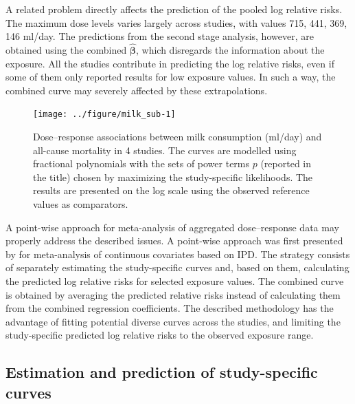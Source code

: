 \documentclass[11pt,a4paper,twoside,openany]{book}\usepackage{knitr}
\begin{document}
{{\noindent A related problem directly affects the prediction of the pooled log relative risks. The maximum dose levels varies largely across studies, with values 715, 441, 369, 146 ml/day. 
The predictions from the second stage analysis, however, are obtained using the combined $\boldsymbol{\hat \beta}$, which disregards the information about the exposure. All the studies contribute in predicting the log relative risks, even if some of them only reported results for low exposure values. In such a way, the combined curve may severely affected by these extrapolations.

\begin{knitrout}\footnotesize
{}\color{fgcolor}\begin{figure}[ht!]

{\centering \texttt{[image: ../figure/milk\_sub-1]} 

}

\caption[Dose--response associations between milk consumption (ml/day) and all-cause mortality in 4 studies]{Dose--response associations between milk consumption (ml/day) and all-cause mortality in 4 studies. The curves are modelled using fractional polynomials with the sets of power terms $p$ (reported in the title) chosen by maximizing the study-specific likelihoods. The results are presented on the log scale using the observed reference values as comparators.}\label{fig:milk_sub}
\end{figure}


\end{knitrout}

A point-wise approach for meta-analysis of aggregated dose--response data may properly address the described issues.
A point-wise approach was first presented by \cite{sauerbrei2011new} for meta-analysis of continuous covariates based on IPD. The strategy consists of separately estimating the study-specific curves and, based on them, calculating the predicted log relative risks for selected exposure values. The combined curve is obtained by averaging the predicted relative risks instead of calculating them from the combined regression coefficients. The described methodology has the advantage of fitting potential diverse curves across the studies, and limiting the study-specific predicted log relative risks to the observed exposure range.   

\subsection{Estimation and prediction of study-specific curves}

}}
\end{document}
